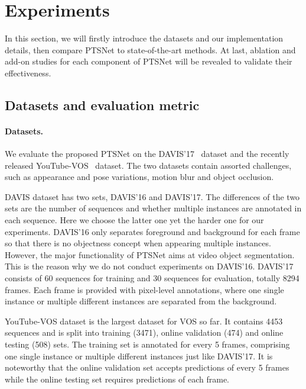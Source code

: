 \documentclass[10pt,twocolumn,letterpaper]{article}
\begin{document}
\section{Experiments} \label{Experiments}
In this section, we will firstly introduce the datasets and our implementation details, then compare PTSNet to state-of-the-art methods. At last, ablation and add-on studies for each component of PTSNet will be revealed to validate their effectiveness.

\subsection{Datasets and evaluation metric} \label{Datasets}

    \paragraph{Datasets.}
    We evaluate the proposed PTSNet on the DAVIS'17~\cite{davis_eval_cvpr16} dataset and the recently released YouTube-VOS~\cite{yvos_eccv18} dataset. The two datasets contain assorted challenges, such as appearance and pose variations, motion blur and object occlusion.
    
    DAVIS dataset has two sets, DAVIS'16 and DAVIS'17. The differences of the two sets are the number of sequences and whether multiple instances are annotated in each sequence. Here we choose the latter one yet the harder one for our experiments. DAVIS'16 only separates foreground and background for each frame so that there is no objectness concept when appearing multiple instances. However, the major functionality of PTSNet aims at video object segmentation. This is the reason why we do not conduct experiments on DAVIS'16. DAVIS'17 consists of 60 sequences for training and 30 sequences for evaluation, totally 8294 frames. Each frame is provided with pixel-level annotations, where one single instance or multiple different instances are separated from the background.
    
    YouTube-VOS dataset is the largest dataset for VOS so far. It contains 4453 sequences and is split into training (3471), online validation (474) and online testing (508) sets. The training set is annotated for every 5 frames, comprising one single instance or multiple different instances just like DAVIS'17. It is noteworthy that the online validation set accepts predictions of every 5 frames while the online testing set requires predictions of each frame.
    
\end{document}
